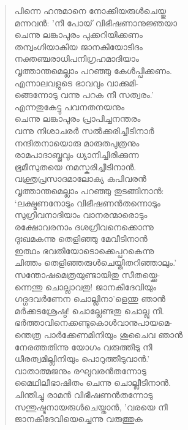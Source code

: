 \begin{verse}
പിന്നെ ഹനുമാനെ നോക്കിയരുള്‍ചെയ്തു\\
മന്നവന്‍: ’നീ പോയ് വിഭീഷണാനുജ്ഞയാ\\
ചെന്നു ലങ്കാപുരം പുക്കറിയിക്കണം\\
തന്വംഗിയാകിയ ജാനകിയോടിദം\\
നക്തഞ്ചരാധിപനിഗ്രഹമാദിയാം\\
വൃത്താന്തമെല്ലാം പറഞ്ഞു കേള്‍പ്പിക്കണം.\\
എന്നാലവളുടെ ഭാവവും വാക്കുമി-\\
ങ്ങെന്നോടു വന്നു പറക നീ സത്വരം.’\\
എന്നതുകേട്ടു പവനതനയനും\\
ചെന്നു ലങ്കാപുരം പ്രാപിച്ചനന്തരം\\
വന്നു നിശാചരര്‍ സല്‍ക്കരിച്ചീടിനാര്‍\\
നന്ദിതനായൊരു മാരുതപുത്രനും\\
രാമപാദാബ്ജവും ധ്യാനിച്ചിരിക്കുന്ന\\
ഭൂമീസുതയെ നമസ്കരിച്ചീടിനാന്‍.\\
വക്ത്രപ്രസാദമാലോക്യ കപിവരന്‍\\
വൃത്താന്തമെല്ലാം പറഞ്ഞു തുടങ്ങിനാന്‍:\\
‘ലക്ഷ്മണനോടും വിഭീഷണന്‍തന്നൊടും\\
സുഗ്രീവനാദിയാം വാനരന്മാരൊടും\\
രക്ഷോവരനാം ദശഗ്രീവനെക്കൊന്നു\\
ദുഃഖമകന്നു തെളിഞ്ഞു മേവീടിനാന്‍\\
ഇത്ഥം ഭവതിയോടൊക്കെപ്പറകെന്നു\\
ചിത്തം തെളിഞ്ഞരുള്‍ചെയ്തിതറിഞ്ഞാലും.’\\
സന്തോഷമെത്രയുണ്ടായിതു സീതയ്ക്കെ-\\
ന്നെന്തു ചൊല്ലാവതു! ജാനകീദേവിയും\\
ഗദ്ഗദവര്‍ണേന ചൊല്ലിനാ’ളെന്തു ഞാന്‍\\
മര്‍ക്കടശ്രേഷ്ഠ! ചൊല്ലേണ്ടതു ചൊല്ലു നീ.\\
ഭര്‍ത്താവിനെക്കണ്ടുകൊള്‍വാനുപായമെ-\\
ന്തെത്ര പാര്‍ക്കേണമിനിയും ശുചൈവ ഞാന്‍\\
നേരത്തതിന്നു യോഗം വരുത്തീടു നീ\\
ധീരത്വമില്ലിനിയും പൊറുത്തീടുവാന്‍.’\\
വാതാത്മജനും രഘുവരന്‍തന്നോടു\\
മൈഥിലീഭാഷിതം ചെന്നു ചൊല്ലീടിനാന്‍.\\
ചിന്തിച്ചു രാമന്‍ വിഭീഷണന്‍തന്നോടു\\
സന്തുഷ്ടനായരുള്‍ചെയ്താന്‍, ’വരയെ നീ\\
ജാനകീദേവിയെച്ചെന്നു വരുത്തുക\\

\end{verse}
